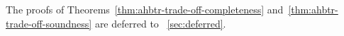 \label{sec:ahbtr-trade-off}







\noindent
The proofs of
Theorems~\ref{thm:ahbtr-trade-off-completeness}
and~\ref{thm:ahbtr-trade-off-soundness}
are deferred to \Section~\ref{sec:deferred}.
